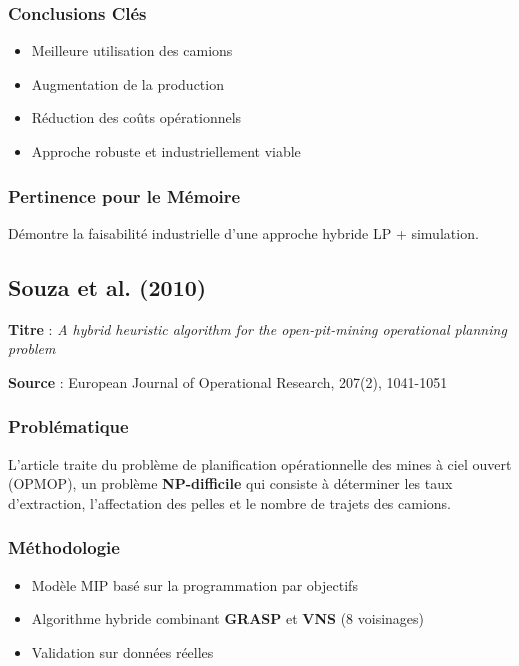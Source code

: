 \documentclass[12pt,a4paper]{article}
\begin{document}
\subsubsection{Conclusions Cl\'es}

\begin{itemize}
    \item Meilleure utilisation des camions
    \item Augmentation de la production
    \item R\'eduction des co\^uts op\'erationnels
    \item Approche robuste et industriellement viable
\end{itemize}

\subsubsection{Pertinence pour le M\'emoire}

D\'emontre la faisabilit\'e industrielle d'une approche hybride LP + simulation.

\subsection{Souza et al. (2010)}

\textbf{Titre} : \textit{A hybrid heuristic algorithm for the open-pit-mining operational planning problem}

\textbf{Source} : European Journal of Operational Research, 207(2), 1041-1051

\subsubsection{Probl\'ematique}

L'article traite du probl\`eme de planification op\'erationnelle des mines \`a ciel ouvert (OPMOP), un probl\`eme \textbf{NP-difficile} qui consiste \`a d\'eterminer les taux d'extraction, l'affectation des pelles et le nombre de trajets des camions.

\subsubsection{M\'ethodologie}

\begin{itemize}
    \item Mod\`ele MIP bas\'e sur la programmation par objectifs
    \item Algorithme hybride combinant \textbf{GRASP} et \textbf{VNS} (8 voisinages)
    \item Validation sur donn\'ees r\'eelles
\end{itemize}
\end{document}
